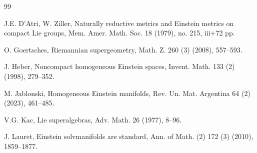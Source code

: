 \documentclass[reqno]{amsart}
\theoremstyle{definition}
\begin{document}
\begin{thebibliography}{99}

 J.E. D'Atri, W. Ziller,   Naturally reductive metrics and Einstein metrics on compact Lie groups, Mem. Amer. Math. Soc. 18 (1979), no. 215, iii+72 pp.


 O. Goertsches, Riemannian supergeometry, Math. Z. 260 (3) (2008), 557--593.



 J. Heber,  Noncompact homogeneous Einstein spaces, Invent. Math. 133 (2) (1998), 279--352.

 M. Jablonski, Homogeneous Einstein manifolds,
Rev. Un. Mat. Argentina 64 (2) (2023), 461--485.


 V.G. Kac, Lie superalgebras,  Adv. Math. 26 (1977), 8--96.




 J. Lauret, Einstein solvmanifolds are standard, Ann. of Math. (2) 172 (3) (2010), 1859--1877.




\end{thebibliography}
\end{document}
